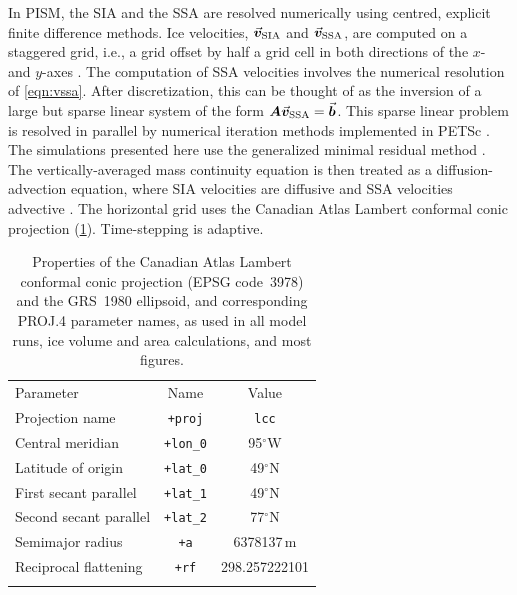 \documentclass[a4paper]{kappa}
\newcommand\tophline{\hline\noalign{\vspace{1mm}}}
\newcommand\middlehline{\noalign{\vspace{1mm}}\hline\noalign{\vspace{1mm}}}
\newcommand\bottomhline{\noalign{\vspace{1mm}}\hline}
\newcommand{\vect}[1]{\va*{#1}} %
\newcommand{\tens}[1]{\vb*{#1}} %
\newcommand{\vv}[0]{\vect{v}}           %
\newcommand{\vsia}[0]{\vv_{\mathrm{SIA}}}   %
\newcommand{\vssa}[0]{\vv_{\mathrm{SSA}}}   %
\newcommand{\degree}[0]{\ensuremath{^{\circ}}}
\begin{document}
In PISM, the SIA and the SSA are resolved numerically using centred, explicit
finite difference methods. Ice velocities, $\vsia$ and $\vssa$, are computed on
a staggered grid, i.e., a grid offset by half a grid cell in both directions of
the $x$- and $y$-axes \citep{Bueler.Brown.2009, Winkelmann.etal.2011}. The
computation of SSA velocities involves the numerical resolution of
\cref{eqn:vssa}. After discretization, this can be thought of as the inversion
of a large but sparse linear system of the form $\tens{A}\vssa=\vect{b}$. This
sparse linear problem is resolved in parallel by numerical iteration methods
implemented in PETSc \citep{Balay.etal.2014}. The simulations presented here
use the generalized minimal residual method \citep[GMRES,][]{Saad.2003}. The
vertically-averaged mass continuity equation is then treated as a
diffusion-advection equation, where SIA velocities are diffusive and SSA
velocities advective \citep{Bueler.Brown.2009, Winkelmann.etal.2011}. The
horizontal grid uses the Canadian Atlas Lambert conformal conic projection
(\cref{tab:proj}). Time-stepping is adaptive.

\begin{table}
  \caption{Properties of the Canadian Atlas Lambert conformal conic projection
           (EPSG code~3978) and the GRS~1980 ellipsoid, and corresponding
           PROJ.4 parameter names, as used in all model runs, ice volume and
           area calculations, and most figures.}
  \label{tab:proj}
  \begin{tabular*}{80mm}{@{\extracolsep{\fill}}lcc}
    \tophline
    Parameter               & Name              & Value \\
    \middlehline
    Projection name         & \texttt{+proj}    & \texttt{lcc} \\
    Central meridian        & \texttt{+lon\_0}  & 95\degree W \\
    Latitude of origin      & \texttt{+lat\_0}  & 49\degree N \\
    First secant parallel   & \texttt{+lat\_1}  & 49\degree N \\
    Second secant parallel  & \texttt{+lat\_2}  & 77\degree N \\
    Semimajor radius        & \texttt{+a}       & 6378137\,m \\
    Reciprocal flattening   & \texttt{+rf}      & 298.257222101 \\
    \bottomhline
  \end{tabular*}
\end{table}
\end{document}
